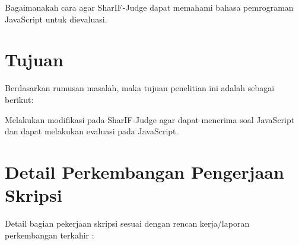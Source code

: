 \documentclass[a4paper,twoside]{article}
\begin{document}
     Bagaimanakah cara agar SharIF-Judge dapat memahami bahasa pemrograman JavaScript untuk dievaluasi.

\section{Tujuan}
Berdasarkan rumusan masalah, maka tujuan penelitian ini adalah sebagai berikut:

    Melakukan modifikasi pada SharIF-Judge agar dapat menerima soal JavaScript dan dapat melakukan evaluasi pada JavaScript.


\section{Detail Perkembangan Pengerjaan Skripsi}
Detail bagian pekerjaan skripsi sesuai dengan rencan kerja/laporan perkembangan terkahir :
\end{document}
